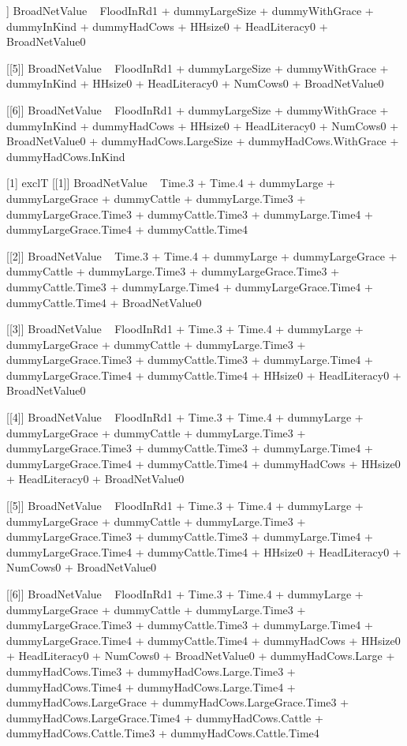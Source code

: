 \begin{Schunk}
\begin{Soutput}
[[4]]
BroadNetValue ~ FloodInRd1 + dummyLargeSize + dummyWithGrace + 
    dummyInKind + dummyHadCows + HHsize0 + HeadLiteracy0 + BroadNetValue0

[[5]]
BroadNetValue ~ FloodInRd1 + dummyLargeSize + dummyWithGrace + 
    dummyInKind + HHsize0 + HeadLiteracy0 + NumCows0 + BroadNetValue0

[[6]]
BroadNetValue ~ FloodInRd1 + dummyLargeSize + dummyWithGrace + 
    dummyInKind + dummyHadCows + HHsize0 + HeadLiteracy0 + NumCows0 + 
    BroadNetValue0 + dummyHadCows.LargeSize + dummyHadCows.WithGrace + 
    dummyHadCows.InKind

[1] exclT
[[1]]
BroadNetValue ~ Time.3 + Time.4 + dummyLarge + dummyLargeGrace + 
    dummyCattle + dummyLarge.Time3 + dummyLargeGrace.Time3 + 
    dummyCattle.Time3 + dummyLarge.Time4 + dummyLargeGrace.Time4 + 
    dummyCattle.Time4

[[2]]
BroadNetValue ~ Time.3 + Time.4 + dummyLarge + dummyLargeGrace + 
    dummyCattle + dummyLarge.Time3 + dummyLargeGrace.Time3 + 
    dummyCattle.Time3 + dummyLarge.Time4 + dummyLargeGrace.Time4 + 
    dummyCattle.Time4 + BroadNetValue0

[[3]]
BroadNetValue ~ FloodInRd1 + Time.3 + Time.4 + dummyLarge + dummyLargeGrace + 
    dummyCattle + dummyLarge.Time3 + dummyLargeGrace.Time3 + 
    dummyCattle.Time3 + dummyLarge.Time4 + dummyLargeGrace.Time4 + 
    dummyCattle.Time4 + HHsize0 + HeadLiteracy0 + BroadNetValue0

[[4]]
BroadNetValue ~ FloodInRd1 + Time.3 + Time.4 + dummyLarge + dummyLargeGrace + 
    dummyCattle + dummyLarge.Time3 + dummyLargeGrace.Time3 + 
    dummyCattle.Time3 + dummyLarge.Time4 + dummyLargeGrace.Time4 + 
    dummyCattle.Time4 + dummyHadCows + HHsize0 + HeadLiteracy0 + 
    BroadNetValue0

[[5]]
BroadNetValue ~ FloodInRd1 + Time.3 + Time.4 + dummyLarge + dummyLargeGrace + 
    dummyCattle + dummyLarge.Time3 + dummyLargeGrace.Time3 + 
    dummyCattle.Time3 + dummyLarge.Time4 + dummyLargeGrace.Time4 + 
    dummyCattle.Time4 + HHsize0 + HeadLiteracy0 + NumCows0 + 
    BroadNetValue0

[[6]]
BroadNetValue ~ FloodInRd1 + Time.3 + Time.4 + dummyLarge + dummyLargeGrace + 
    dummyCattle + dummyLarge.Time3 + dummyLargeGrace.Time3 + 
    dummyCattle.Time3 + dummyLarge.Time4 + dummyLargeGrace.Time4 + 
    dummyCattle.Time4 + dummyHadCows + HHsize0 + HeadLiteracy0 + 
    NumCows0 + BroadNetValue0 + dummyHadCows.Large + dummyHadCows.Time3 + 
    dummyHadCows.Large.Time3 + dummyHadCows.Time4 + dummyHadCows.Large.Time4 + 
    dummyHadCows.LargeGrace + dummyHadCows.LargeGrace.Time3 + 
    dummyHadCows.LargeGrace.Time4 + dummyHadCows.Cattle + dummyHadCows.Cattle.Time3 + 
    dummyHadCows.Cattle.Time4


\end{Soutput}
\end{Schunk}
